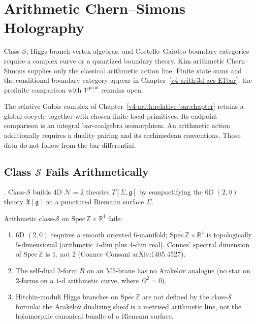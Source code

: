 \chapter{Arithmetic Chern--Simons Holography}
\label{v4-arith:gaiotto}

Class-\(\mathcal S\), Higgs-branch vertex algebras, and
Costello--Gaiotto boundary categories require a complex curve or a
quantized boundary theory. Kim arithmetic Chern--Simons supplies only
the classical arithmetic action line. Finite state sums and the
conditional boundary category appear in
Chapter~\ref{v4-arith:3d-acs-E1bar}; the profinite comparison with
\(\mathcal V^{\mathrm{prim}}\) remains open.

The relative Galois complex of Chapter~\ref{v4-arith:relative-bar:chapter}
retains a global cocycle together with chosen finite-local primitives.
Its endpoint comparison is an integral bar-coalgebra isomorphism.
An arithmetic action additionally requires a duality pairing and its
archimedean conventions. Those data do not follow from the bar differential.

\section{Class \(\mathcal{S}\) Fails Arithmetically}
\label{v4-arith:ga:class-S-fails}

\begin{theorem}
\label{v4-arith:thm:gaiotto-class-S}
\ClaimStatusProvedElsewhere. Class-\(\mathcal{S}\) builds
4D \(\mathcal{N}=2\) theories \(T[\Sigma,\mathfrak{g}]\) by
compactifying the 6D \((2,0)\) theory \(\mathfrak{X}[\mathfrak{g}]\) on
a punctured Riemann surface \(\Sigma\).
\end{theorem}

\begin{observation}
\label{v4-arith:obs:class-S-obstructions}
Arithmetic class-\(\mathcal{S}\) on \(\overline{\mathrm{Spec}\,\mathbb{Z}}\times\mathbb{R}^{4}\)
fails:
\begin{enumerate}
\item 6D \((2,0)\) requires a smooth oriented \(6\)-manifold;
\(\overline{\mathrm{Spec}\,\mathbb{Z}}\times\mathbb{R}^{4}\) is
topologically \(5\)-dimensional (arithmetic \(1\)-dim plus \(4\)-dim
real). Connes' spectral dimension of \(\overline{\mathrm{Spec}\,\mathbb{Z}}\)
is \(1\), not \(2\) (Connes--Consani arXiv:1405.4527).
\item The self-dual \(2\)-form \(B\) on an M5-brane has no Arakelov
analogue (no star on \(2\)-forms on a \(1\)-d arithmetic curve, where
\(\Omega^{2}=0\)).
\item Hitchin-moduli Higgs branches on
\(\overline{\mathrm{Spec}\,\mathbb{Z}}\) are not defined by the
class-\(\mathcal S\) formula: the Arakelov dualizing sheaf is a
metrised arithmetic line, not the holomorphic canonical bundle of a
Riemann surface.
\end{enumerate}
\end{observation}

